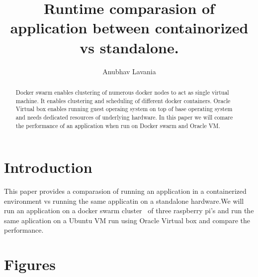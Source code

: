 
\title{Runtime comparasion of application between containorized vs standalone.}

\author{Anubhav Lavania}


\renewcommand{\shortauthors}{G. v. Laszewski}


\begin{abstract}
Docker swarm enables clustering of numerous docker nodes to act as
single virtual machine. It enables clustering and scheduling of
different docker containers. 
Oracle Virtual box enables running guest operaing system on top of
base operating system and needs dedicated resources of underlying
hardware.
In this paper we will comare the performance of an application when
run on Docker swarm and Oracle VM.

\end{abstract}



\maketitle


\section{Introduction}

This paper provides a comparasion of running an application in a
containerized environment vs running the same applicatin on a
standalone hardware.We will run an application on a docker swarm
cluster~\cite{hid-sp18-413-dockerswarm} of three raspberry pi's and
run the same aplication on a Ubuntu VM run using Oracle Virtual box and compare the performance.

\section{Figures}


